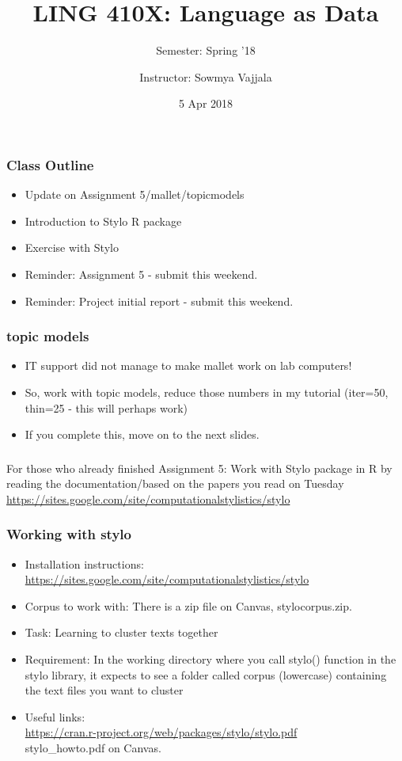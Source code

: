 \documentclass{beamer}
\author[Sowmya Vajjala]{Instructor: Sowmya Vajjala}
\title[LING 410X]{LING 410X: Language as Data}
\subtitle{Semester: Spring '18}
\date{5 Apr 2018}
\institute{Iowa State University, USA}
\begin{document}
\begin{frame}\titlepage
\end{frame}

\begin{frame}
\frametitle{Class Outline}
\begin{itemize}
\item Update on Assignment 5/mallet/topicmodels
\item Introduction to Stylo R package
\item Exercise with Stylo
\item Reminder: Assignment 5 - submit this weekend.
\item Reminder: Project initial report - submit this weekend.
\end{itemize}
\end{frame}

\begin{frame}
\frametitle{topic models}
\begin{itemize}
\item IT support did not manage to make mallet work on lab computers!
\item So, work with topic models, reduce those numbers in my tutorial (iter=50, thin=25 - this will perhaps work) 
\item If you complete this, move on to the next slides. 
\end{itemize}
\end{frame}

\begin{frame}
\frametitle{}
For those who already finished Assignment 5: 
Work with Stylo package in R by reading the documentation/based on the papers you read on Tuesday\\
\footnotesize \url{https://sites.google.com/site/computationalstylistics/stylo}
\end{frame}

\begin{frame}
\frametitle{Working with stylo}
\begin{itemize}
\item Installation instructions: \\ \url{https://sites.google.com/site/computationalstylistics/stylo}
\item Corpus to work with: There is a zip file on Canvas, stylocorpus.zip. 
\item Task: Learning to cluster texts together
\item Requirement: In the working directory where you call stylo() function in the stylo library, it expects to see a folder called corpus (lowercase) containing the text files you want to cluster
\item Useful links:
\\ \url{https://cran.r-project.org/web/packages/stylo/stylo.pdf}
\\ stylo\_howto.pdf on Canvas.
\end{itemize}
\end{frame}
\end{document}
